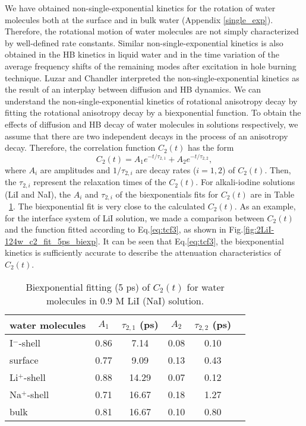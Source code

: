 We have obtained non-single-exponential kinetics for the rotation of water molecules both at the surface 
and in bulk water (Appendix \ref{single_exp}).
Therefore, the rotational motion of water molecules are not simply characterized by well-defined rate constants. 
Similar non-single-exponential kinetics is also obtained in the HB kinetics
in liquid water \cite{AL96,Dirama2005} and in the time variation of the average frequency shifts of the 
remaining modes after excitation in hole burning technique.\cite{Rey2002,Moller2004} 
Luzar and Chandler interpreted the non-single-exponential kinetics as the result of an interplay between 
diffusion and HB dynamics. \cite{AL96} 
We can understand the non-single-exponential kinetics of rotational 
anisotropy decay by fitting the rotational anisotropy decay by a 
biexponential function.
To obtain the effects of diffusion and HB decay of water molecules
in solutions respectively, we assume that there are two independent 
decays in the process of an anisotropy decay. 
Therefore, the correlation function $C_2(t)$ has the form \cite{TanHS05}
\begin{equation}
C_2(t)=A_1e^{-t/\tau_{2,1}} +A_2e^{-t/\tau_{2,2}},
\label{eq:tcf3}
\end{equation}
where $A_i$ are amplitudes and $1/\tau_{2,i}$ are decay rates ($i=1, 2$) of $C_2(t)$. 
Then, the $\tau_{2,i}$ represent the relaxation times of the $C_2(t)$. 
For alkali-iodine solutions (LiI and NaI), the $A_i$ and $\tau_{2,i}$ of the biexponentials fits for 
$C_2(t)$ are in Table ~\ref{tab:2LiI_c2_biexp}.
The biexponential fit is very close to the calculated $C_2(t)$. 
As an example, for the interface system of LiI solution, we made a comparison between $C_2(t)$ 
and the function fitted according to Eq.\thinspace\ref{eq:tcf3},
as shown in Fig.\thinspace\ref{fig:2LiI-124w_c2_fit_5ps_biexp}. 
It can be seen that Eq.\thinspace\ref{eq:tcf3}, the biexponential kinetics is sufficiently accurate to 
describe the attenuation characteristics of $C_2(t)$.                        
\begin{table}[H]%
\centering
\caption{\label{tab:2LiI_c2_biexp}%
	Biexponential fitting (5 ps) of $C_2(t)$ for water molecules in 0.9 M LiI (NaI) solution.}
\begin{tabular}{lccccc}
water molecules & $A_1$  & $\tau_{2,1}$ (ps) & $A_2$ & $\tau_{2,2}$ (ps) \\
\hline
  I$^-$-shell & 0.86 & 7.14 & 0.08 & 0.10 \\
  surface & 0.77 & 9.09 & 0.13 & 0.43 \\
  Li$^+$-shell & 0.88 & 14.29 & 0.07 & 0.12\\
  Na$^+$-shell & 0.71 & 16.67 & 0.18 & 1.27 \\
  bulk & 0.81 & 16.67 & 0.10 & 0.80 \\
\end{tabular}
\end{table}


